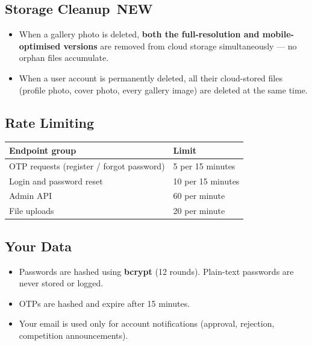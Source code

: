 \documentclass[12pt,a4paper]{article}
\newcommand{\newbadge}{%
  \colorbox{NewFrame}{\color{white}\,\textbf{\footnotesize NEW}\,}%
}
\begin{document}
\subsection{Storage Cleanup \newbadge}

\begin{itemize}
  \item When a gallery photo is deleted, \textbf{both the full-resolution and mobile-optimised versions} are removed from cloud storage simultaneously --- no orphan files accumulate.
  \item When a user account is permanently deleted, all their cloud-stored files (profile photo, cover photo, every gallery image) are deleted at the same time.
\end{itemize}

\subsection{Rate Limiting}

\begin{center}
\renewcommand{\arraystretch}{1.3}
\begin{tabularx}{\linewidth}{L{5cm} X}
\toprule
\textbf{Endpoint group} & \textbf{Limit} \\
\midrule
OTP requests (register / forgot password) & 5 per 15 minutes \\
Login and password reset & 10 per 15 minutes \\
Admin API & 60 per minute \\
File uploads & 20 per minute \\
\bottomrule
\end{tabularx}
\end{center}

\subsection{Your Data}

\begin{itemize}
  \item Passwords are hashed using \textbf{bcrypt} (12 rounds). Plain-text passwords are never stored or logged.
  \item OTPs are hashed and expire after 15 minutes.
  \item Your email is used only for account notifications (approval, rejection, competition announcements).
\end{itemize}

\end{document}

